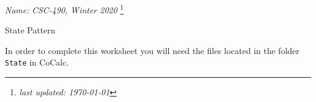 \documentclass[11pt]{article}
\newlength{\up}\setlength{\up}{-\baselineskip}
\newcommand\blfootnote[1]{%
  \begingroup
  \renewcommand\thefootnote{}\footnote{#1}%
  \addtocounter{footnote}{-1}%
  \endgroup
}
\begin{document}
\noindent\emph{Name:}
\hfill
\emph{CSC-490, Winter 2020}
\blfootnote{\emph{last updated: \today}}

\begin{center}
  {\huge State Pattern}
\end{center}

\medskip




In order to complete this worksheet you will need the files located in the folder \texttt{State} in CoCalc.
\end{document}
